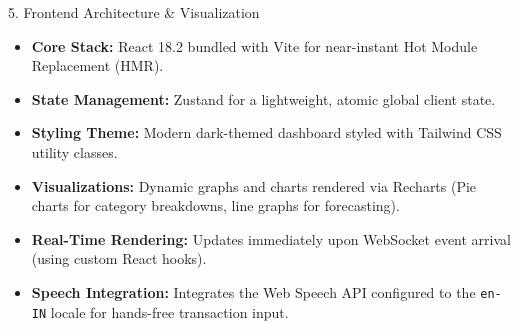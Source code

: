 \documentclass[10pt,aspectratio=169]{beamer}
\begin{document}
\begin{frame}{5. Frontend Architecture \& Visualization}
    \begin{itemize}
        \item \textbf{Core Stack:} React 18.2 bundled with Vite for near-instant Hot Module Replacement (HMR).
        \item \textbf{State Management:} Zustand for a lightweight, atomic global client state.
        \item \textbf{Styling Theme:} Modern dark-themed dashboard styled with Tailwind CSS utility classes.
        \item \textbf{Visualizations:} Dynamic graphs and charts rendered via Recharts (Pie charts for category breakdowns, line graphs for forecasting).
        \item \textbf{Real-Time Rendering:} Updates immediately upon WebSocket event arrival (using custom React hooks).
        \item \textbf{Speech Integration:} Integrates the Web Speech API configured to the \texttt{en-IN} locale for hands-free transaction input.
    \end{itemize}
\end{frame}
\end{document}
